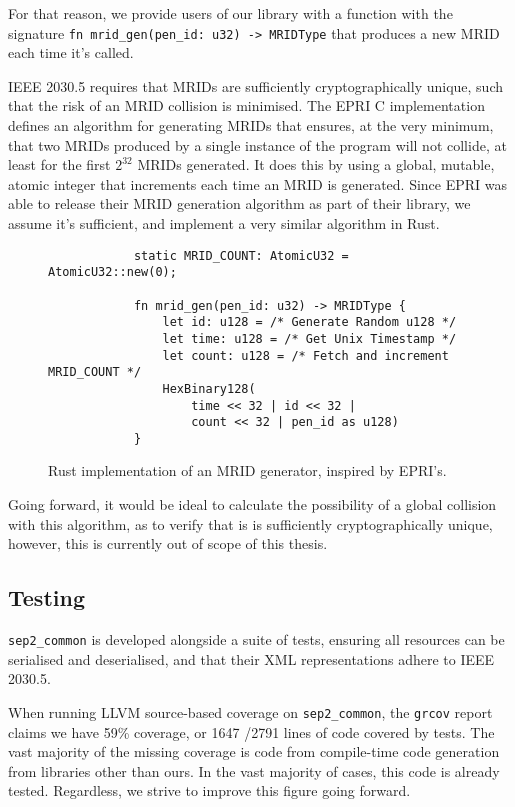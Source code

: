 For that reason, we provide users of our library with a function with the signature \texttt{fn mrid\_gen(pen\_id: u32) -> MRIDType} that produces a new MRID each time it's called.

IEEE 2030.5 requires that MRIDs are sufficiently cryptographically unique, such that the risk of an MRID collision is minimised. The EPRI C implementation defines an algorithm for generating MRIDs that ensures, at the very minimum, that two MRIDs produced by a single instance of the program will not collide, at least for the first $2^{32}$ MRIDs generated. It does this by using a global, mutable, atomic integer that increments each time an MRID is generated. Since EPRI was able to release their MRID generation algorithm as part of their library, we assume it's sufficient, and implement a very similar algorithm in Rust.

\begin{figure}[H]
    \begin{center}
        \begin{lstlisting}
            static MRID_COUNT: AtomicU32 = AtomicU32::new(0);

            fn mrid_gen(pen_id: u32) -> MRIDType {
                let id: u128 = /* Generate Random u128 */
                let time: u128 = /* Get Unix Timestamp */
                let count: u128 = /* Fetch and increment MRID_COUNT */
                HexBinary128(
                    time << 32 | id << 32 | 
                    count << 32 | pen_id as u128)
            }
        \end{lstlisting}
        \label{fig:mridgenalgo}
        \caption{Rust implementation of an MRID generator, inspired by EPRI's.}
    \end{center}
\end{figure}


Going forward, it would be ideal to calculate the possibility of a global collision with this algorithm, as to verify that is is sufficiently cryptographically unique, however, this is currently out of scope of this thesis.

\subsection{Testing}
\texttt{sep2\_common} is developed alongside a suite of tests, ensuring all resources can be serialised and deserialised, and that their XML representations adhere to IEEE 2030.5.

When running LLVM source-based coverage on \texttt{sep2\_common}, the \texttt{grcov} report claims we have 59\% coverage, or 1647 \slash 2791 lines of code covered by tests. The vast majority of the missing coverage is code from compile-time code generation from libraries other than ours. In the vast majority of cases, this code is already tested. Regardless, we strive to improve this figure going forward.

